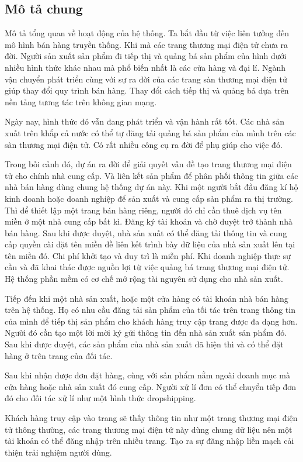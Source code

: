 \subsection{Mô tả chung}
Mô tả tổng quan về hoạt động của hệ thống. Ta bắt đầu từ việc liên tưởng đến mô hình bán hàng truyền thống. Khi mà các trang thương mại điện tử chưa ra đời. Người sản xuất sản phẩm đi tiếp thị và quảng bá sản phẩm của hình dưới nhiều hình thức khác nhau mà phổ biến nhất là các cửa hàng và đại lí. Ngành vận chuyển phát triển cùng với sự ra đời của các trang sàn thương mại điện tử giúp thay đổi quy trình bán hàng. Thay đổi cách tiếp thị và quảng bá dựa trên nền tảng tương tác trên không gian mạng.

Ngày nay, hình thức đó vẫn đang phát triển và vận hành rất tốt. Các nhà sản xuất trên khắp cả nước có thể tự đăng tải quảng bá sản phẩm của mình trên các sàn thương mại điện tử. Có rất nhiều công cụ ra đời để phụ giúp cho việc đó.

Trong bối cảnh đó, dự án ra đời để giải quyết vấn đề tạo trang thương mại điện tử cho chính nhà cung cấp. Và liên kết sản phẩm để phân phối thông tin giữa các nhà bán hàng dùng chung hệ thống dự án này. Khi một người bắt đầu đăng kí hộ kinh doanh hoặc doanh nghiệp để sản xuất và cung cấp sản phẩm ra thị trường. Thì để thiết lập một trang bán hàng riêng, người đó chỉ cần thuê dịch vụ tên miền ở một nhà cung cấp bất kì. Đăng ký tài khoản và chờ duyệt trở thành nhà bán hàng. Sau khi được duyệt, nhà sản xuất có thể đăng tải thông tin và cung cấp quyền cài đặt tên miền đề liên kết trình bày dữ liệu của nhà sản xuất lên tại tên miền đó. Chi phí khởi tạo và duy trì là miễn phí. Khi doanh nghiệp thực sự cần và đã khai thác được nguồn lợi từ việc quảng bá trang thương mại điện tử. Hệ thống phần mềm có cơ chế mở rộng tài nguyên sử dụng cho nhà sản xuất.

Tiếp đến khi một nhà sản xuất, hoặc một cửa hàng có tài khoản nhà bán hàng trên hệ thống. Họ có nhu cầu đăng tải sản phẩm của tối tác trên trang thông tin của mình để tiếp thị sản phẩm cho khách hàng truy cập trang được đa dạng hơn. Người đó cần tạo một lời mời ký gửi thông tin đến nhà sản xuất sản phẩm đó. Sau khi được duyệt, các sản phẩm của nhà sản xuất đã hiện thì và có thể đặt hàng ở trên trang của đối tác.

Sau khi nhận được đơn đặt hàng, cùng với sản phẩm nằm ngoài doanh mục mà cửa hàng hoặc nhà sản xuất đó cung cấp. Người xử lí đơn có thể chuyển tiếp đơn đó cho đối tác xử lí như một hình thức dropshipping.

Khách hàng truy cập vào trang sẽ thấy thông tin như một trang thương mại điện tử thông thường, các trang thương mại điện tử này dùng chung dữ liệu nên một tài khoản có thể đăng nhập trên nhiều trang. Tạo ra sự đăng nhập liền mạch cải thiện trải nghiệm người dùng.

